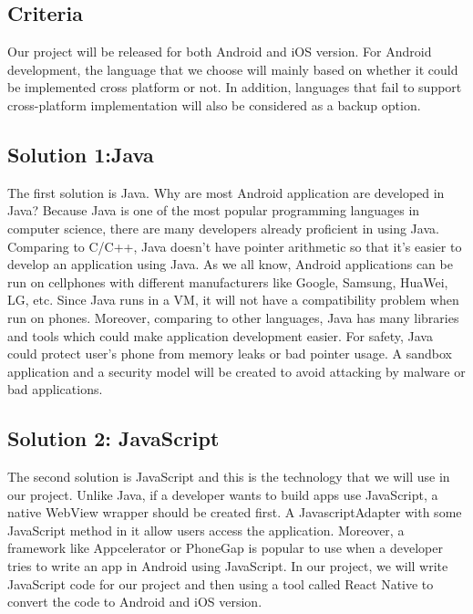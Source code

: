 \documentclass[letterpaper, 10pt,titlepage]{article}
\begin{document}
\subsection{Criteria}
Our project will be released for both Android and iOS version. For Android development, the language that we choose will mainly based on whether it could be implemented cross platform or not. In addition, languages that fail to support cross-platform implementation will also be considered as a backup option.\\

\subsection{Solution 1:Java} 
The first solution is Java. Why are most Android application are developed in Java? Because Java is one of the most popular programming languages in computer science, there are many developers already proficient in using Java. Comparing to C/C++, Java doesn’t have pointer arithmetic so that it’s easier to develop an application using Java. As we all know, Android applications can be run on cellphones with different manufacturers like Google, Samsung, HuaWei, LG, etc. Since Java runs in a VM, it will not have a compatibility problem when run on phones. Moreover, comparing to other languages, Java has many libraries and tools which could make application development easier. For safety, Java could protect user’s phone from memory leaks or bad pointer usage. A sandbox application and a security model will be created to avoid attacking by malware or bad applications.\cite{java}\\


\subsection{Solution 2: JavaScript}
The second solution is JavaScript and this is the technology that we will use in our project. Unlike Java, if a developer wants to build apps use JavaScript, a native WebView wrapper should be created first. A JavascriptAdapter with some JavaScript method in it allow users access the application. Moreover, a framework like Appcelerator or PhoneGap is popular to use when a developer tries to write an app in Android using JavaScript. In our project, we will write JavaScript code for our project and then using a tool called React Native to convert the code to Android and iOS version.\\
\end{document}
